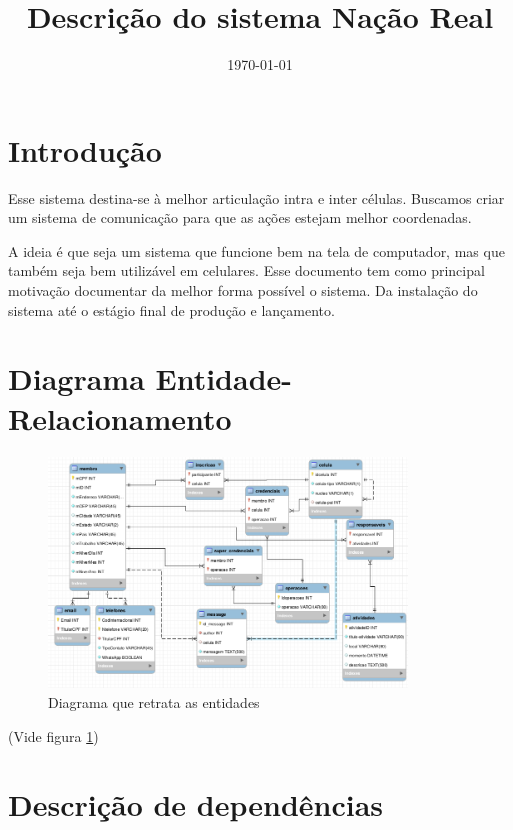 \documentclass{article}
\title{Descrição do sistema Nação Real}
\date{\today}
\begin{document}
    \maketitle
    \tableofcontents
    \listoffigures
    \lstlistoflistings
    \newpage

    \section{Introdução}
    \label{s-intro}

    Esse sistema destina-se à melhor articulação intra e inter células. Buscamos criar um sistema de comunicação para
    que as ações estejam melhor coordenadas.

    A ideia é que seja um sistema que funcione bem na tela de computador, mas que também seja bem utilizável em celulares.
    Esse documento tem como principal motivação documentar da melhor forma possível o sistema. Da instalação do sistema até
    o estágio final de produção e lançamento.


    \section[DER]{Diagrama Entidade-Relacionamento}
    \label{DER}

    \begin{figure}
        \centering
        \includegraphics[width=0.85\textwidth]{bd.png}
        \caption{Diagrama que retrata as entidades}
        \label{fig:der}
    \end{figure}

    (Vide figura \ref{fig:der})

    \section[Dependências]{Descrição de dependências}
\end{document}
